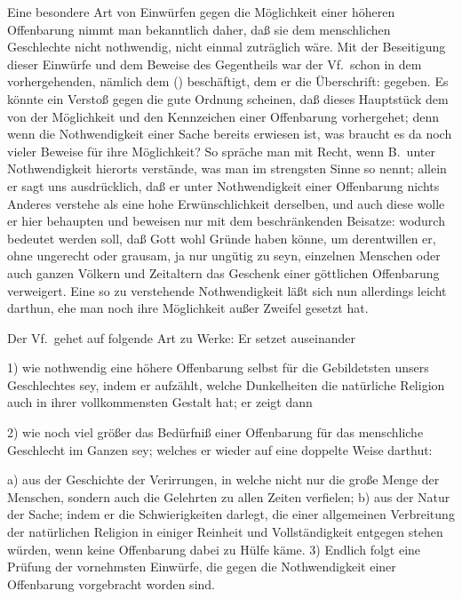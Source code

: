 Eine besondere Art von Einwürfen gegen die Möglichkeit einer höheren Offenbarung nimmt man bekanntlich daher, daß sie dem menschlichen Geschlechte nicht nothwendig, nicht einmal zuträglich wäre. Mit der Beseitigung dieser Einwürfe und dem Beweise des Gegentheils war der Vf.\ schon in dem vorhergehenden, nämlich dem  () beschäftigt, dem er die Überschrift:   gegeben. Es könnte ein Verstoß gegen die gute Ordnung scheinen, daß dieses Hauptstück dem von der Möglichkeit und den Kennzeichen einer Offenbarung vorhergehet; denn wenn die Nothwendigkeit einer Sache bereits erwiesen ist, was braucht es da noch vieler Beweise für ihre Möglichkeit? So spräche man mit Recht, wenn B.\ unter Nothwendigkeit hierorts verstände, was man im strengsten Sinne so nennt; allein er sagt uns  ausdrücklich, daß er unter Nothwendigkeit einer Offenbarung nichts Anderes verstehe als eine hohe Erwünschlichkeit derselben, und auch diese wolle er hier behaupten und beweisen nur mit dem beschränkenden Beisatze:  wodurch bedeutet werden soll, daß Gott wohl Gründe haben könne, um derentwillen er, ohne ungerecht oder grausam, ja nur ungütig zu seyn, einzelnen Menschen oder auch ganzen Völkern und Zeitaltern das Geschenk einer göttlichen Offenbarung verweigert. Eine so zu verstehende Nothwendigkeit läßt sich nun allerdings leicht darthun, ehe man noch ihre Möglichkeit außer Zweifel gesetzt hat. \par
Der Vf.\ gehet auf folgende Art zu Werke: Er setzet auseinander \par
1) wie nothwendig eine höhere Offenbarung selbst für die Gebildetsten unsers Geschlechtes sey, indem er aufzählt, welche Dunkelheiten die natürliche Religion auch in ihrer vollkommensten Gestalt hat; er zeigt dann \par
2) wie noch viel größer das Bedürfniß einer Offenbarung für das menschliche Geschlecht im Ganzen sey; welches er wieder auf eine doppelte Weise darthut: \par
a) aus der Geschichte der Verirrungen, in welche nicht nur die große Menge der Menschen, sondern auch die Gelehrten zu allen Zeiten verfielen; b) aus der Natur der Sache; indem er die Schwierigkeiten darlegt, die einer allgemeinen Verbreitung der natürlichen Religion in einiger Reinheit und Vollständigkeit entgegen stehen würden, wenn keine Offenbarung dabei zu Hülfe käme.  3) Endlich folgt eine Prüfung der vornehmsten Einwürfe, die gegen die Nothwendigkeit einer Offenbarung vorgebracht worden sind. \par
